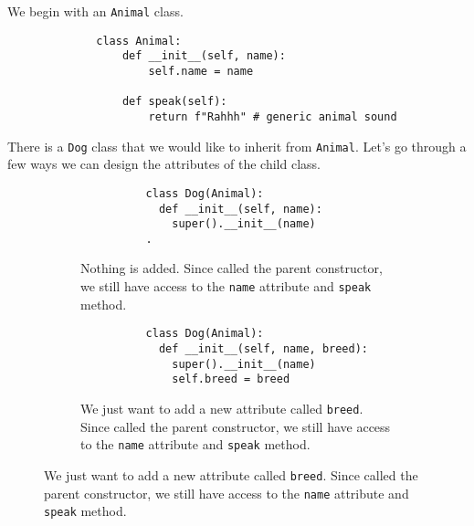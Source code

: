   \begin{example}
    We begin with an \texttt{Animal} class.

    \begin{figure}[H]
      \centering 
      \begin{lstlisting}
        class Animal: 
            def __init__(self, name):
                self.name = name
            
            def speak(self):
                return f"Rahhh" # generic animal sound
      \end{lstlisting} 
      \caption{} 
    \end{figure}

    There is a \texttt{Dog} class that we would like to inherit from \texttt{Animal}. Let's go through a few ways we can design the attributes of the child class. 

    \begin{figure}[H]
      \centering
      \begin{subfigure}[b]{0.48\textwidth}
        \centering
        \begin{lstlisting}
          class Dog(Animal): 
            def __init__(self, name): 
              super().__init__(name) 
          .
        \end{lstlisting}
        \caption{Nothing is added. Since called the parent constructor, we still have access to the \texttt{name} attribute and \texttt{speak} method. }
      \end{subfigure}
      \hfill 
      \begin{subfigure}[b]{0.48\textwidth}
        \centering
        \begin{lstlisting}
          class Dog(Animal): 
            def __init__(self, name, breed): 
              super().__init__(name)
              self.breed = breed
        \end{lstlisting}
        \caption{We just want to add a new attribute called \texttt{breed}. Since called the parent constructor, we still have access to the \texttt{name} attribute and \texttt{speak} method. }
      \end{subfigure}


\end{figure}
\end{example}
